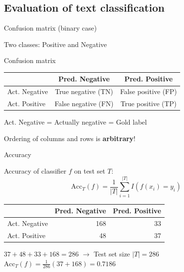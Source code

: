 \documentclass[12pt,aspectratio=169,handout]{beamer}
\begin{document}
\subsection{Evaluation of text classification}


\begin{frame}{Confusion matrix (binary case)}

Two classes: Positive and Negative

\begin{block}{Confusion matrix}
\begin{tabular}{l|cc}
& Pred. Negative & Pred. Positive \\ \toprule
Act. Negative & True negative (TN) & False positive (FP) \\
Act. Positive & False negative (FN) & True positive (TP) \\
\end{tabular}
\end{block}

\bigskip

Act. Negative = Actually negative = Gold label

Ordering of columns and rows is \textbf{arbitrary}!

\end{frame}


\begin{frame}{Accuracy}

Accuracy of classifier $f$ on test set $T$:
$$
\mathrm{Acc}_T(f) = \frac{1}{|T|} \sum_{i = 1}^{|T|} I (f(x_i) = y_i)
$$
	
\begin{example}
	\begin{tabular}{l|rr}
		& Pred. Negative & Pred. Positive \\ \toprule
		Act. Negative & 168 & 33 \\
		Act. Positive & 48 & 37 \\
	\end{tabular}
\end{example}

$37 + 48 + 33 + 168 = 286$ $\to$ Test set size $|T| = 286$
$\mathrm{Acc}_T(f) = \frac{1}{286} (37 + 168) = 0.7186$

	
\end{frame}
\end{document}
